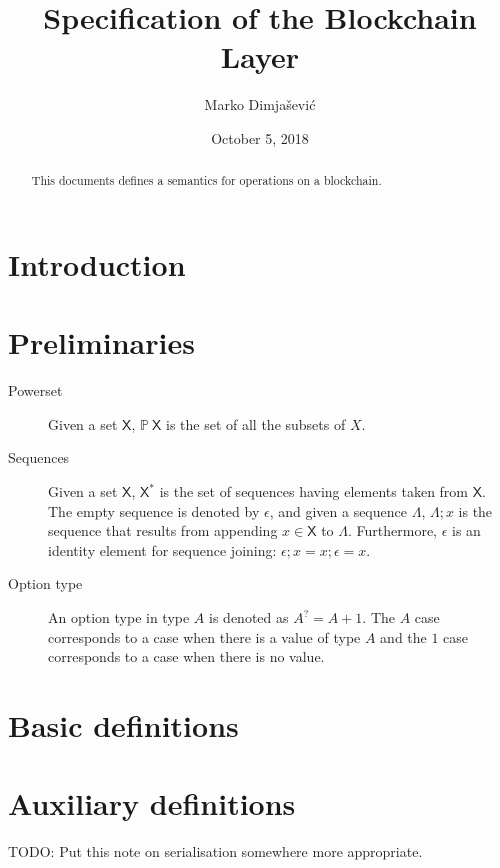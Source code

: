\documentclass[11pt,a4paper]{article}
\newcommand{\powerset}[1]{\mathbb{P}~#1}
\newcommand{\type}[1]{\mathsf{#1}}
\newcommand{\seqof}[1]{#1^{*}}
\begin{document}
\title{Specification of the Blockchain Layer}

\author{Marko Dimjašević}

\date{October 5, 2018}

\maketitle

\begin{abstract}
This documents defines a semantics for operations on a blockchain.
\end{abstract}

\tableofcontents
\listoffigures

\section{Introduction}
\label{sec:introduction}

\section{Preliminaries}
\label{sec:preliminaries}

\begin{description}
\item[Powerset] Given a set $\type{X}$, $\powerset{\type{X}}$ is the set of all
  the subsets of $X$.
\item[Sequences] Given a set $\type{X}$, $\seqof{\type{X}}$ is the set of
  sequences having elements taken from $\type{X}$.
  The empty sequence is denoted by $\epsilon$, and given a sequence $\Lambda$,
  $\Lambda; x$ is the sequence that results from appending
  $x \in \type{X}$ to $\Lambda$.
  Furthermore, $\epsilon$ is an identity element for sequence joining:
  $\epsilon; x = x; \epsilon = x$.
\item[Option type] An option type in type $A$ is denoted as $A^? = A + 1$. The
  $A$ case corresponds to a case when there is a value of type $A$ and the $1$
  case corresponds to a case when there is no value.
\end{description}

\section{Basic definitions}
\label{sec:basic-definitions}

\section{Auxiliary definitions}
\label{sec:auxil-defin}
TODO: Put this note on serialisation somewhere more appropriate.
\end{document}
